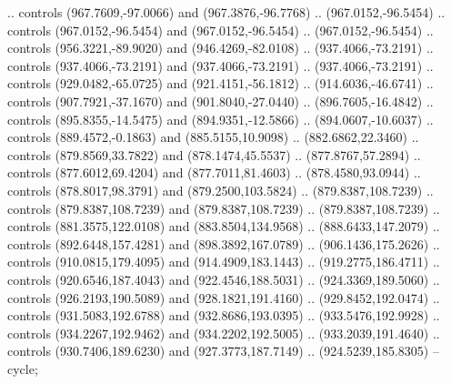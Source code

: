 \begin{scope}[shift={(-127.26916,-608.18524)}]
\begin{scope}
\begin{scope}[shift={(-190.60299,773.9938)},opacity=0.500,transparency group]
        .. controls (967.7609,-97.0066) and (967.3876,-96.7768) .. (967.0152,-96.5454)
        .. controls (967.0152,-96.5454) and (967.0152,-96.5454) .. (967.0152,-96.5454)
        .. controls (956.3221,-89.9020) and (946.4269,-82.0108) .. (937.4066,-73.2191)
        .. controls (937.4066,-73.2191) and (937.4066,-73.2191) .. (937.4066,-73.2191)
        .. controls (929.0482,-65.0725) and (921.4151,-56.1812) .. (914.6036,-46.6741)
        .. controls (907.7921,-37.1670) and (901.8040,-27.0440) .. (896.7605,-16.4842)
        .. controls (895.8355,-14.5475) and (894.9351,-12.5866) .. (894.0607,-10.6037)
        .. controls (889.4572,-0.1863) and (885.5155,10.9098) .. (882.6862,22.3460) ..
        controls (879.8569,33.7822) and (878.1474,45.5537) .. (877.8767,57.2894) ..
        controls (877.6012,69.4204) and (877.7011,81.4603) .. (878.4580,93.0944) ..
        controls (878.8017,98.3791) and (879.2500,103.5824) .. (879.8387,108.7239) ..
        controls (879.8387,108.7239) and (879.8387,108.7239) .. (879.8387,108.7239) ..
        controls (881.3575,122.0108) and (883.8504,134.9568) .. (888.6433,147.2079) ..
        controls (892.6448,157.4281) and (898.3892,167.0789) .. (906.1436,175.2626) ..
        controls (910.0815,179.4095) and (914.4909,183.1443) .. (919.2775,186.4711) ..
        controls (920.6546,187.4043) and (922.4546,188.5031) .. (924.3369,189.5060) ..
        controls (926.2193,190.5089) and (928.1821,191.4160) .. (929.8452,192.0474) ..
        controls (931.5083,192.6788) and (932.8686,193.0395) .. (933.5476,192.9928) ..
        controls (934.2267,192.9462) and (934.2202,192.5005) .. (933.2039,191.4640) ..
        controls (930.7406,189.6230) and (927.3773,187.7149) .. (924.5239,185.8305) --
        cycle;


\end{scope}
\end{scope}
\end{scope}
